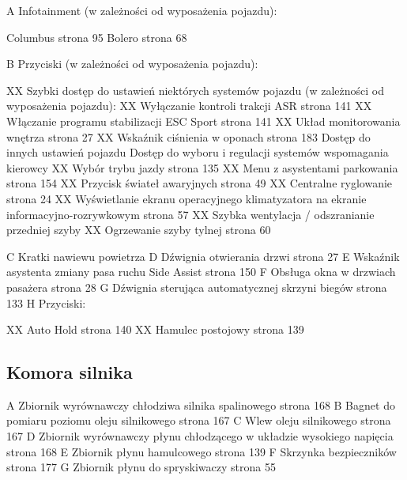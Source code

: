 A Infotainment (w zależności od wyposażenia pojazdu):
\begin{itemizeTriangle}
	\itemTriangle Columbus \guillemotright strona 95
	\itemTriangle Bolero \guillemotright strona 68
\end{itemizeTriangle}
B Przyciski (w zależności od wyposażenia pojazdu):
\begin{itemizeTriangle}
		\itemTriangle XX Szybki dostęp do ustawień niektórych systemów pojazdu (w zależności od wyposażenia pojazdu):
		\itemTriangle XX Wyłączanie kontroli trakcji ASR \guillemotright strona 141
		\itemTriangle XX Włączanie programu stabilizacji ESC Sport \guillemotright strona 141
		\itemTriangle XX Układ monitorowania wnętrza \guillemotright strona 27
		\itemTriangle XX Wskaźnik ciśnienia w oponach \guillemotright strona 183
		\itemTriangle Dostęp do innych ustawień pojazdu
		\itemTriangle Dostęp do wyboru i regulacji systemów wspomagania kierowcy
	\itemTriangle XX Wybór trybu jazdy \guillemotright strona 135
	\itemTriangle XX Menu z asystentami parkowania \guillemotright strona 154
	\itemTriangle XX Przycisk świateł awaryjnych \guillemotright strona 49
	\itemTriangle XX Centralne ryglowanie \guillemotright strona 24
	\itemTriangle XX Wyświetlanie ekranu operacyjnego klimatyzatora na ekranie informacyjno-rozrywkowym \guillemotright strona 57
	\itemTriangle XX Szybka wentylacja / odszranianie przedniej szyby
	\itemTriangle XX Ogrzewanie szyby tylnej \guillemotright strona 60
\end{itemizeTriangle}
C Kratki nawiewu powietrza
D Dźwignia otwierania drzwi \guillemotright strona 27
E Wskaźnik asystenta zmiany pasa ruchu Side Assist \guillemotright strona 150
F Obsługa okna w drzwiach pasażera \guillemotright strona 28
G Dźwignia sterująca automatycznej skrzyni biegów \guillemotright strona 133
H Przyciski:
\begin{itemizeTriangle}
	\itemTriangle XX Auto Hold \guillemotright strona 140
	\itemTriangle XX Hamulec postojowy \guillemotright strona 139
\end{itemizeTriangle}

\subsection{Komora silnika}


A Zbiornik wyrównawczy chłodziwa silnika spalinowego \guillemotright strona 168
B Bagnet do pomiaru poziomu oleju silnikowego \guillemotright strona 167
C Wlew oleju silnikowego \guillemotright strona 167
D Zbiornik wyrównawczy płynu chłodzącego w układzie wysokiego napięcia \guillemotright strona 168
E Zbiornik płynu hamulcowego \guillemotright strona 139
F Skrzynka bezpieczników \guillemotright strona 177
G Zbiornik płynu do spryskiwaczy \guillemotright strona 55

